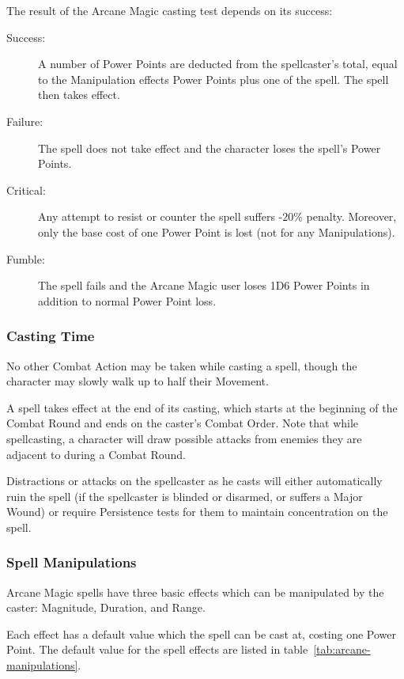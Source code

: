 The result of the Arcane Magic casting test depends on its success:
\begin{description}
	\item[Success:] A number of Power Points are deducted from the spellcaster’s total, equal to the Manipulation effects Power Points plus one of the spell. The spell then takes effect.
	\item[Failure:] The spell does not take effect and the character loses the spell's Power Points.
	\item[Critical:] Any attempt to resist or counter the spell suffers -20\% penalty. Moreover, only the base cost of one Power Point is lost (not for any Manipulations).
	\item[Fumble:] The spell fails and the Arcane Magic user loses 1D6 Power Points in addition to normal Power Point loss.
\end{description}


\subsubsection{Casting Time}
No other Combat Action may be taken while casting a spell, though the character may slowly walk up to half their Movement. 

A spell takes effect at the end of its casting, which starts at the beginning of the Combat Round and ends on the caster's Combat Order. Note that while spellcasting, a character will draw possible attacks from enemies they are adjacent to during a Combat Round. 

Distractions or attacks on the spellcaster as he casts will either automatically ruin the spell (if the spellcaster is blinded or disarmed, or suffers a Major Wound) or require Persistence tests for them to maintain concentration on the spell. 

\subsubsection{Spell Manipulations}
Arcane Magic spells have three basic effects which can be manipulated by the caster: Magnitude, Duration, and Range.

Each effect has a default value which the spell can be cast at, costing one Power Point. The default value for the spell effects are listed in table~\ref{tab:arcane-manipulations}.


